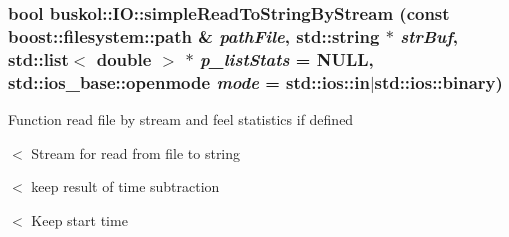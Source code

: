 \hypertarget{group__libbuskol_gac962eb969ccaa2b77a024a28c3c2b702}{
\subsubsection[{simpleReadToStringByStream}]{\setlength{\rightskip}{0pt plus 5cm}bool buskol::IO::simpleReadToStringByStream (const boost::filesystem::path \& {\em pathFile}, \/  std::string $\ast$ {\em strBuf}, \/  std::list$<$ double $>$ $\ast$ {\em p\_\-listStats} = {\ttfamily NULL}, \/  std::ios\_\-base::openmode {\em mode} = {\ttfamily std::ios::in$|$std::ios::binary})}}
\label{group__libbuskol_gac962eb969ccaa2b77a024a28c3c2b702}
Function read file by stream and feel statistics if defined 

$<$ Stream for read from file to string

$<$ keep result of time subtraction

$<$ Keep start time 

